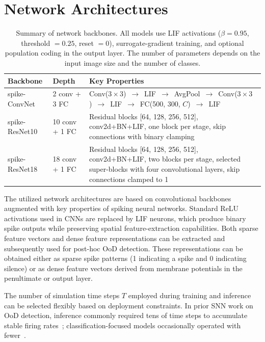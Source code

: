 \documentclass{ieeeaccess}
\begin{document}
\section{Network Architectures}
\label{sec:network}

\begin{table}[tbp]
\caption{Summary of network backbones. All models use LIF activations ($\beta=0.95$, threshold $=0.25$, reset $=0$), surrogate-gradient training, and optional population coding in the output layer. The number of parameters depends on the input image size and the number of classes.}
\begin{center}
\small
\begin{tabular}{l l p{10cm}}
\toprule
\textbf{Backbone} & \textbf{Depth} & \textbf{Key Properties} \\
\midrule
spike-ConvNet & 2 conv + 3 FC & Conv($3{\times}3$)~$\rightarrow$~LIF~$\rightarrow$~AvgPool~$\rightarrow$~Conv($3{\times}3$)~$\rightarrow$~LIF~$\rightarrow$~FC(500, 300, $C$)~$\rightarrow$~LIF \\
\midrule
spike-ResNet10 & 10 conv + 1 FC & Residual blocks [64, 128, 256, 512], conv2d+BN+LIF, one block per stage, skip connections with binary clamping \\
\midrule
spike-ResNet18 & 18 conv + 1 FC & Residual blocks [64, 128, 256, 512], conv2d+BN+LIF, two blocks per stage, selected super-blocks with four convolutional layers, skip connections clamped to 1 \\
\bottomrule
\end{tabular}
\label{tab:network-backbones}
\end{center}
\end{table}

The utilized network architectures are based on convolutional backbones augmented with key properties of spiking neural networks. Standard ReLU activations used in CNNs are replaced by LIF neurons, which produce binary spike outputs while preserving spatial feature-extraction capabilities. Both sparse feature vectors and dense feature representations can be extracted and subsequently used for post-hoc OoD detection. These representations can be obtained either as sparse spike patterns (1 indicating a spike and 0 indicating silence) or as dense feature vectors derived from membrane potentials in the penultimate or output layer.

The number of simulation time steps $T$ employed during training and inference can be selected flexibly based on deployment constraints. In prior SNN work on OoD detection, inference commonly required tens of time steps to accumulate stable firing rates~\cite{2023-martinez}; classification-focused models occasionally operated with fewer~\cite{2021deep}.
\end{document}
